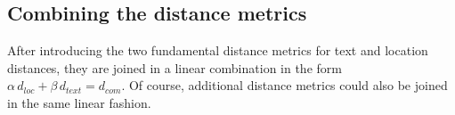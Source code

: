 


 

\subsection{Combining the distance metrics}
After introducing the two fundamental distance metrics for text and location distances, they are joined in a linear combination in the form $\alpha \, d_{loc} + \beta \, d_{text} = d_{com}$. Of course, additional distance metrics could also be joined in the same linear fashion.

